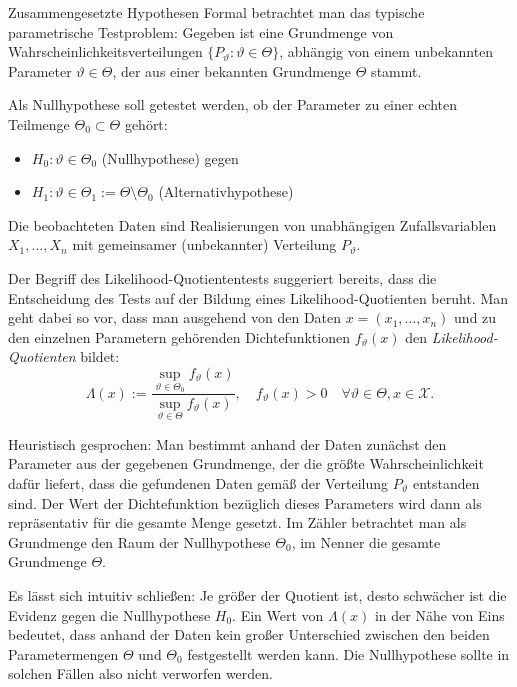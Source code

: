 \begin{defi}{Zusammengesetzte Hypothesen}
    Formal betrachtet man das typische parametrische Testproblem:
    Gegeben ist eine Grundmenge von Wahrscheinlichkeitsverteilungen $\{ P_{\vartheta} : \vartheta \in \Theta \}$, abhängig von einem unbekannten Parameter $\vartheta \in \Theta$, der aus einer bekannten Grundmenge $\Theta$ stammt.

    Als Nullhypothese soll getestet werden, ob der Parameter zu einer echten Teilmenge $\Theta_0 \subset \Theta$ gehört:
    \begin{itemize}
        \item $H_0: \vartheta \in \Theta_0$ (Nullhypothese) gegen
        \item $H_1: \vartheta \in \Theta_1 := \Theta \setminus \Theta_0$ (Alternativhypothese)
    \end{itemize}

    Die beobachteten Daten sind Realisierungen von unabhängigen Zufallsvariablen $X_1, \ldots, X_n$ mit gemeinsamer (unbekannter) Verteilung $P_{\vartheta}$.

    Der Begriff des Likelihood-Quotiententests suggeriert bereits, dass die Entscheidung des Tests auf der Bildung eines Likelihood-Quotienten beruht.
    Man geht dabei so vor, dass man ausgehend von den Daten $x = (x_1, \ldots, x_n)$ und zu den einzelnen Parametern gehörenden Dichtefunktionen $f_{\vartheta}(x)$ den \emph{Likelihood-Quotienten} bildet:
    \[
        \Lambda(x) := \frac{\sup_{\vartheta \in \Theta_0} f_{\vartheta}(x)}{\sup_{\vartheta \in \Theta} f_{\vartheta}(x)}, \quad f_{\vartheta}(x) > 0 \quad \forall \vartheta \in \Theta, x \in \mathcal{X}.
    \]

    Heuristisch gesprochen:
    Man bestimmt anhand der Daten zunächst den Parameter aus der gegebenen Grundmenge, der die größte Wahrscheinlichkeit dafür liefert, dass die gefundenen Daten gemäß der Verteilung $P_{\vartheta}$ entstanden sind.
    Der Wert der Dichtefunktion bezüglich dieses Parameters wird dann als repräsentativ für die gesamte Menge gesetzt.
    Im Zähler betrachtet man als Grundmenge den Raum der Nullhypothese $\Theta_0$, im Nenner die gesamte Grundmenge $\Theta$.

    Es lässt sich intuitiv schließen:
    Je größer der Quotient ist, desto schwächer ist die Evidenz gegen die Nullhypothese $H_0$.
    Ein Wert von $\Lambda(x)$ in der Nähe von Eins bedeutet, dass anhand der Daten kein großer Unterschied zwischen den beiden Parametermengen $\Theta$ und $\Theta_0$ festgestellt werden kann.
    Die Nullhypothese sollte in solchen Fällen also nicht verworfen werden.


\end{defi}
